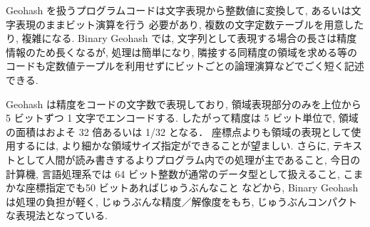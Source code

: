 \documentclass[11pt]{jsarticle}
\begin{document}
Geohash を扱うプログラムコードは文字表現から整数値に変換して, あるいは文字表現のままビット演算を行う
必要があり, 複数の文字定数テーブルを用意したり, 複雑になる. 
Binary Geohash では, 文字列として表現する場合の長さは精度情報のため長くなるが, 処理は簡単になり, 
隣接する同精度の領域を求める等のコードも定数値テープルを利用せずにビットごとの論理演算などでごく短く記述できる. 

Geohash は精度をコードの文字数で表現しており, 領域表現部分のみを上位から 5 ビットずつ 1 文字でエンコードする. 
したがって精度は 5 ビット単位で, 領域の面積はおよそ 32 倍あるいは 1/32 となる．
座標点よりも領域の表現として使用するには, より細かな領域サイズ指定ができることが望ましい. 
さらに, テキストとして人間が読み書きするよりプログラム内での処理が主であること, 
今日の計算機, 言語処理系では 64 ビット整数が通常のデータ型として扱えること, 
こまかな座標指定でも50 ビットあればじゅうぶんなこと
などから,  Binary Geohash は処理の負担が軽く, じゅうぶんな精度／解像度をもち, じゅうぶんコンパクトな表現法となっている. 
\end{document}
